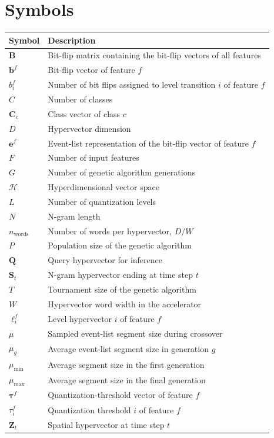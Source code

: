 \documentclass[englishthesis]{i3thesis}
\begin{document}
\chapter*{Symbols}
\renewcommand{\arraystretch}{1.1}
\begin{tabular}{ll}
    Symbol & Description \\
    \hline
    \( \mathbf{B} \) & Bit-flip matrix containing the bit-flip vectors of all features \\
    \( \mathbf{b}^f \) & Bit-flip vector of feature \(f\) \\
    \( b_i^f \) & Number of bit flips assigned to level transition \(i\) of feature \(f\) \\
    \( C \) & Number of classes \\
    \( \mathbf{C}_c \) & Class vector of class \(c\) \\
    \( D \) & Hypervector dimension \\
    \( \mathbf{e}^f \) & Event-list representation of the bit-flip vector of feature \(f\) \\
    \( F \) & Number of input features \\
    \( G \) & Number of genetic algorithm generations \\
    \( \mathcal{H} \) & Hyperdimensional vector space \\
    \( L \) & Number of quantization levels \\
    \( N \) & N-gram length \\
    \( n_{\mathrm{words}} \) & Number of words per hypervector, \(D/W\) \\
    \( P \) & Population size of the genetic algorithm \\
    \( \mathbf{Q} \) & Query hypervector for inference \\
    \( \mathbf{S}_t \) & N-gram hypervector ending at time step \(t\) \\
    \( T \) & Tournament size of the genetic algorithm \\
    \( W \) & Hypervector word width in the accelerator \\
    \( \boldsymbol{\ell}_i^f \) & Level hypervector \(i\) of feature \(f\) \\
    \( \mu \) & Sampled event-list segment size during crossover \\
    \( \mu_g \) & Average event-list segment size in generation \(g\) \\
    \( \mu_{\min} \) & Average segment size in the first generation \\
    \( \mu_{\max} \) & Average segment size in the final generation \\
    \( \boldsymbol{\tau}^f \) & Quantization-threshold vector of feature \(f\) \\
    \( \tau_i^f \) & Quantization threshold \(i\) of feature \(f\) \\
    \( \mathbf{Z}_t \) & Spatial hypervector at time step \(t\) \\
\end{tabular}
\renewcommand{\arraystretch}{1}
\end{document}
